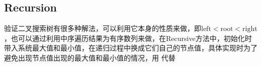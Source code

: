 \subsection{Recursion}
验证二叉搜索树有很多种解法，可以利用它本身的性质来做，即$\text{left} < \text{root} < \text{right}$，也可以通过利用中序遍历结果为有序数列来做，在Recursive方法中，初始化时带入系统最大值和最小值，在递归过程中换成它们自己的节点值，具体实现时为了避免出现节点值出现的最大值和最小值的情况，用 代替

